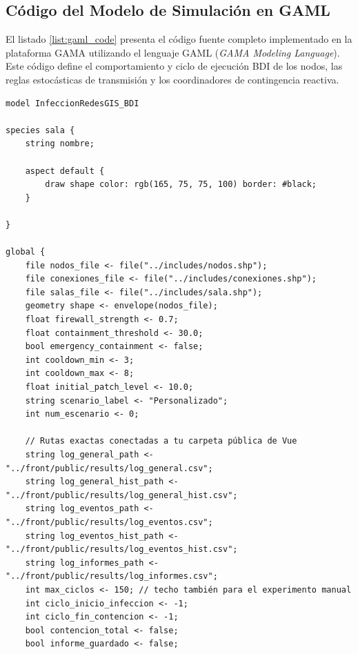 \subsection{Código del Modelo de Simulación en GAML}
\label{appendix:gaml_code}
El listado \ref{list:gaml_code} presenta el código fuente completo implementado en la plataforma GAMA utilizando el lenguaje GAML (\textit{GAMA Modeling Language}). Este código define el comportamiento y ciclo de ejecución BDI de los nodos, las reglas estocásticas de transmisión y los coordinadores de contingencia reactiva.

\begin{lstlisting}[caption={InfeccionRedes.gaml - Código fuente de la simulación en GAMA Platform}, label={list:gaml_code}]
model InfeccionRedesGIS_BDI

species sala {
	string nombre;

	aspect default {
		draw shape color: rgb(165, 75, 75, 100) border: #black;
	}

}

global {
	file nodos_file <- file("../includes/nodos.shp");
	file conexiones_file <- file("../includes/conexiones.shp");
	file salas_file <- file("../includes/sala.shp");
	geometry shape <- envelope(nodos_file);
	float firewall_strength <- 0.7;
	float containment_threshold <- 30.0;
	bool emergency_containment <- false;
	int cooldown_min <- 3;
	int cooldown_max <- 8;
	float initial_patch_level <- 10.0;
	string scenario_label <- "Personalizado";
	int num_escenario <- 0;

	// Rutas exactas conectadas a tu carpeta pública de Vue
	string log_general_path <- "../front/public/results/log_general.csv";
	string log_general_hist_path <- "../front/public/results/log_general_hist.csv";
	string log_eventos_path <- "../front/public/results/log_eventos.csv";
	string log_eventos_hist_path <- "../front/public/results/log_eventos_hist.csv";
	string log_informes_path <- "../front/public/results/log_informes.csv";
	int max_ciclos <- 150; // techo también para el experimento manual
	int ciclo_inicio_infeccion <- -1;
	int ciclo_fin_contencion <- -1;
	bool contencion_total <- false;
	bool informe_guardado <- false;


\end{lstlisting}
